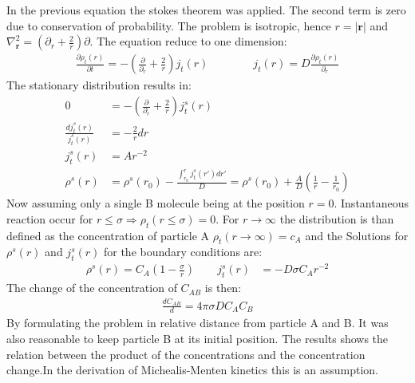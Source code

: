 \documentclass[
  a4paper,BCOR10mm,oneside,
  bibtotoc,idxtotoc,
  headsepline,footsepline,%
  fleqn,openbib
]{scrbook}
\begin{document}
In the previous equation the stokes theorem was applied. The second term is zero due to conservation of probability. The problem is isotropic, hence $r=|\bm{r}|$ and $\nabla^{2}_{\bm{r}}=\left(\partial_r+\frac{2}{r}\right)\partial$. The equation reduce to one dimension:
\begin{align}
\frac{\partial \rho_t(r)}{\partial t}=-\left(\frac{\partial}{\partial_r}+\frac{2}{r} \right) j_t(r) \qquad \qquad j_t(r)=D \frac{\partial\rho_t(r)}{\partial_r}
\end{align}
 The stationary distribution results in:
\begin{align}
 0 &=-\left(\frac{\partial}{\partial_r}+\frac{2}{r} \right) j^{s}_t(r) \\
 \frac{d j^{s}_t(r)}{j^{s}_t(r)}  &=- \frac{2}{r} dr\\
 j^{s}_t(r)&=A r^{-2}\\
 \rho^s(r)&=\rho^s(r_0)- \frac{\int_{r_0}^{r} j^{s}_t(r')dr'}{D}=\rho^s(r_0)+\frac{A}{D}\left(\frac{1}{r}-\frac{1}{r_0}\right)
\end{align}
Now assuming only a single B molecule being at the position $r=0$. Instantaneous reaction occur for $r\leq \sigma \Rightarrow \rho_t(r \leq \sigma)=0$. For $r \rightarrow \infty$ the distribution is than defined as the concentration of particle A $\rho_t(r \rightarrow \infty)=c_A$ and 
the Solutions for $\rho^{s}(r)$ and $j^{s}_t(r)$ for the boundary conditions are:
\begin{align}
 \rho^{s}(r)=C_A \left(1-\frac{\sigma}{r}\right) \qquad j^{s}_t(r)&=-D \sigma C_A r^{-2}
\end{align}
The change of the concentration of $C_{AB}$ is then: 
\begin{align}
 \frac{d C_{AB} }{d}=4 \pi \sigma D C_A C_B
\end{align}
By formulating the problem in relative distance from particle A and B. It was also reasonable to keep particle B at its initial position. The results shows the relation between the product of the concentrations and the concentration change.In the derivation of Michealis-Menten kinetics this is an assumption. 
\end{document}

